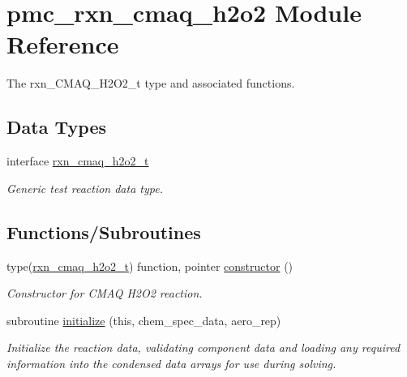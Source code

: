 \hypertarget{namespacepmc__rxn__cmaq__h2o2}{}\section{pmc\+\_\+rxn\+\_\+cmaq\+\_\+h2o2 Module Reference}
\label{namespacepmc__rxn__cmaq__h2o2}


The rxn\+\_\+\+C\+M\+A\+Q\+\_\+\+H2\+O2\+\_\+t type and associated functions.  


\subsection*{Data Types}
\begin{DoxyCompactItemize}
\item 
interface \mbox{\hyperlink{structpmc__rxn__cmaq__h2o2_1_1rxn__cmaq__h2o2__t}{rxn\+\_\+cmaq\+\_\+h2o2\+\_\+t}}
\begin{DoxyCompactList}\small\item\em Generic test reaction data type. \end{DoxyCompactList}\end{DoxyCompactItemize}
\subsection*{Functions/\+Subroutines}
\begin{DoxyCompactItemize}
\item 
type(\mbox{\hyperlink{structpmc__rxn__cmaq__h2o2_1_1rxn__cmaq__h2o2__t}{rxn\+\_\+cmaq\+\_\+h2o2\+\_\+t}}) function, pointer \mbox{\hyperlink{namespacepmc__rxn__cmaq__h2o2_aa4313a0f6cbaa981af9bb374696eb4a5}{constructor}} ()
\begin{DoxyCompactList}\small\item\em Constructor for C\+M\+AQ H2\+O2 reaction. \end{DoxyCompactList}\item 
subroutine \mbox{\hyperlink{namespacepmc__rxn__cmaq__h2o2_ac9b479994bd896861267eb07f73efdff}{initialize}} (this, chem\+\_\+spec\+\_\+data, aero\+\_\+rep)
\begin{DoxyCompactList}\small\item\em Initialize the reaction data, validating component data and loading any required information into the condensed data arrays for use during solving. \end{DoxyCompactList}\end{DoxyCompactItemize}


